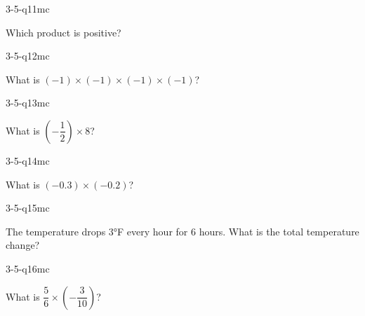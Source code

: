\begin{practiceQuestion}{3-5-q11}{mc}
\begin{questionText}
Which product is positive?
\end{questionText}
\end{practiceQuestion}

\begin{practiceQuestion}{3-5-q12}{mc}
\begin{questionText}
What is $(-1) \times (-1) \times (-1) \times (-1)$?
\end{questionText}
\end{practiceQuestion}

\begin{practiceQuestion}{3-5-q13}{mc}
\begin{questionText}
What is $\left(-\dfrac{1}{2}\right) \times 8$?
\end{questionText}
\end{practiceQuestion}

\begin{practiceQuestion}{3-5-q14}{mc}
\begin{questionText}
What is $(-0.3) \times (-0.2)$?
\end{questionText}
\end{practiceQuestion}

\begin{practiceQuestion}{3-5-q15}{mc}
\begin{questionText}
The temperature drops $3°$F every hour for $6$ hours. What is the total temperature change?
\end{questionText}
\end{practiceQuestion}

\begin{practiceQuestion}{3-5-q16}{mc}
\begin{questionText}
What is $\dfrac{5}{6} \times \left(-\dfrac{3}{10}\right)$?
\end{questionText}
\end{practiceQuestion}

